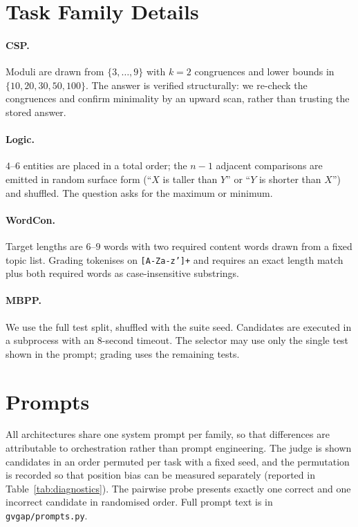 \section{Task Family Details}
\label{app:tasks}

\paragraph{CSP.} Moduli are drawn from $\{3,\dots,9\}$ with $k=2$ congruences
and lower bounds in $\{10,20,30,50,100\}$. The answer is verified structurally:
we re-check the congruences and confirm minimality by an upward scan, rather
than trusting the stored answer.

\paragraph{Logic.} $4$--$6$ entities are placed in a total order; the $n-1$
adjacent comparisons are emitted in random surface form (``$X$ is taller than
$Y$'' or ``$Y$ is shorter than $X$'') and shuffled. The question asks for the
maximum or minimum.

\paragraph{WordCon.} Target lengths are $6$--$9$ words with two required
content words drawn from a fixed topic list. Grading tokenises on
\texttt{[A-Za-z']+} and requires an exact length match plus both required words
as case-insensitive substrings.

\paragraph{MBPP.} We use the full test split, shuffled with the suite seed.
Candidates are executed in a subprocess with an 8-second timeout. The selector
may use only the single test shown in the prompt; grading uses the remaining
tests.

\section{Prompts}
\label{app:prompts}

All architectures share one system prompt per family, so that differences are
attributable to orchestration rather than prompt engineering. The judge is shown
candidates in an order permuted per task with a fixed seed, and the permutation
is recorded so that position bias can be measured separately (reported in
Table~\ref{tab:diagnostics}). The pairwise probe presents exactly one correct
and one incorrect candidate in randomised order. Full prompt text is in
\texttt{gvgap/prompts.py}.


